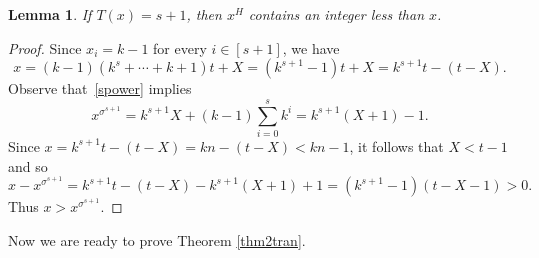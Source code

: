 \documentclass[11pt,a4paper,reqno]{amsart}
\newtheorem{lemma}[theorem]{Lemma}
\theoremstyle{definition}
\begin{document}
\begin{lemma}\label{lm:Ts}
  If $T(x)=s+1$, then $x^H$ contains an integer less than $x$.
\end{lemma}

\begin{proof}
Since $x_i=k-1$ for every $i\in[s+1]$, we have
\begin{equation*}
x=(k-1)(k^s+\cdots+k+1)t+X=(k^{s+1}-1)t+X=k^{s+1}t-(t-X).
\end{equation*}
Observe that~\eqref{spower} implies
\[
 x^{\sigma^{s+1}} =k^{s+1}X+(k-1)\sum_{i=0}^{s} k^i =k^{s+1}(X+1)-1.
\]
Since $x=k^{s+1}t-(t-X)=kn-(t-X)<kn-1$, it follows that $X<t-1$ and so
\[
x-x^{\sigma^{s+1}}=k^{s+1}t-(t-X)-k^{s+1}(X+1)+1=
(k^{s+1}-1)(t-X-1)>0.
\]
Thus $x>x^{\sigma^{s+1}}$.
\end{proof}

Now we are ready to prove Theorem \ref{thm2tran}.
\end{document}
